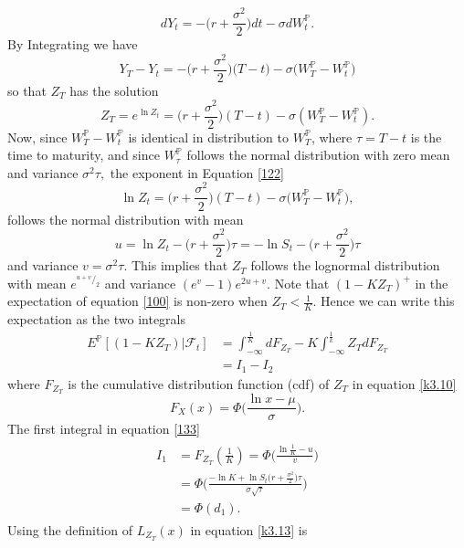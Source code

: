 \documentclass[a4 paper, 12pt]{report}
\newcommand*\rfrac[2]{{}^{#1}\!/_{#2}}
\theoremstyle{plain}
\begin{document}
\begin{equation}\label{11}
dY_t = -\bigg(r +\frac{\sigma^2}{2}\bigg)dt - \sigma dW_t^{\mathbb{P}}.
\end{equation}
By Integrating we have
$$
Y_T - Y_t = -\bigg(r+\frac{\sigma^2}{2}\bigg)\bigg(T-t\bigg) - \sigma\bigg(W_T^{\mathbb{P}} - W_t^{\mathbb{P}}\bigg)
$$
so that $Z_T$ has the solution
\begin{equation}\label{122}
Z_T = e^{\ln Z_t}= \bigg(r+\frac{\sigma^2}{2}\bigg)(T-t)-\sigma(W_T^{\mathbb{P}} - W_t^{\mathbb{P}}).
\end{equation}
Now, since $W_T^{\mathbb{P}} - W_t^{\mathbb{P}}$ is identical in distribution to $W_T^{\mathbb{P}}$, where $\tau = T-t$ is the time to maturity, and since $W_\tau^{\mathbb{P}}$ follows the normal distribution with zero mean and variance $\sigma^2\tau,$ the exponent in Equation \eqref{122}
$$
\ln Z_t = \bigg(r+\frac{\sigma^2}{2}\bigg)(T-t)-\sigma\bigg(W_T^{\mathbb{P}}-W_t^{\mathbb{P}}\bigg),
$$
follows the normal distribution with mean
$$
u = \ln Z_t-\bigg(r+\frac{\sigma^2}{2}\bigg)\tau = -\ln S_t-\bigg(r+\frac{\sigma^2}{2}\bigg)\tau
$$
and variance $v = \sigma^2\tau$. This implies that $Z_T$ follows the lognormal distribution with mean $e^{\rfrac{u+v}{2}}$ and variance $(e^v - 1)e^{2u+v}$. Note that $(1-KZ_T)^+$ in the expectation of equation \eqref{100} is non-zero when $Z_T<\frac{1}{K}$. Hence we can write this expectation as the two integrals
\begin{equation}\label{133}
\begin{split}
E^{\mathbb{P}}[(1-KZ_T)|\mathcal{F}_t]& = \int_{-\infty}^{\frac{1}{K}}dF_{Z_T} - K\int_{-\infty}^{\frac{1}{k}}Z_TdF_{Z_T}\\
& = I_1-I_2
\end{split} 
\end{equation}
where $F_{Z_T}$ is the cumulative distribution function (cdf) of $Z_T$ in equation \eqref{k3.10}
$$
F_X(x) = \Phi\bigg(\frac{\ln x - \mu}{\sigma}\bigg).
$$
The first integral in equation \eqref{133}
\begin{align}\label{14}
\begin{split}
I_1& = F_{Z_T}(\frac{1}{K}) = \Phi\bigg(\frac{\ln\frac{1}{K} - u}{v}\bigg)\\
& =\Phi\bigg(\frac{-\ln K+\ln S_t\bigg(r+\frac{\sigma^2}{2}\bigg)\tau}{\sigma\sqrt{\tau}}\bigg)\\
& = \Phi(d_1).
\end{split}
\end{align}
Using the definition of $L_{Z_T}(x)$ in equation \eqref{k3.13} is 
\end{document}
